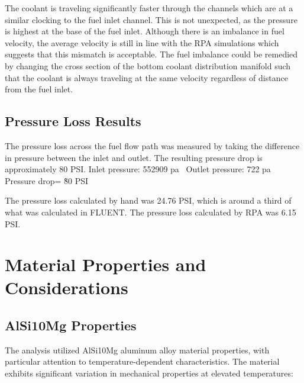 The coolant is traveling significantly faster through the channels which are at a similar clocking to the fuel inlet channel. This is not unexpected, as the pressure is highest at the base of the fuel inlet. Although there is an imbalance in fuel velocity, the average velocity is still in line with the RPA simulations which suggests that this mismatch is acceptable. The fuel imbalance could be remedied by changing the cross section of the bottom coolant distribution manifold such that the coolant is always traveling at the same velocity regardless of distance from the fuel inlet. 

\subsection{Pressure Loss Results}
The pressure loss across the fuel flow path was measured by taking the difference in pressure between the inlet and outlet. The resulting pressure drop is approximately 80 PSI.
Inlet pressure: 552909 pa 
Outlet pressure: 722 pa
Pressure drop= \~80 PSI 

The pressure loss calculated by hand was 24.76 PSI, which is around a third of what was calculated in FLUENT. The pressure loss calculated by RPA was 6.15 PSI. 

 

\section{Material Properties and Considerations}

\subsection{AlSi10Mg Properties}

The analysis utilized AlSi10Mg aluminum alloy material properties, with particular attention to temperature-dependent characteristics. The material exhibits significant variation in mechanical properties at elevated temperatures:

